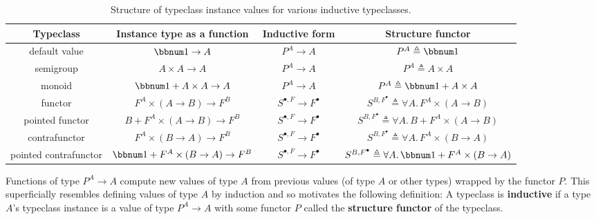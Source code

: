 \begin{table}
\begin{centering}
\begin{tabular}{|c|c|c|c|}
\hline 
\textbf{\small{}Typeclass} & \textbf{\small{}Instance type as a function} & \textbf{\small{}Inductive form} & \textbf{\small{}Structure functor}\tabularnewline
\hline 
\hline 
{\small{}default value} & {\small{}$\bbnum 1\rightarrow A$} & {\small{}$P^{A}\rightarrow A$} & {\small{}$P^{A}\triangleq\bbnum 1$}\tabularnewline
\hline 
{\small{}semigroup} & {\small{}$A\times A\rightarrow A$} & {\small{}$P^{A}\rightarrow A$} & {\small{}$P^{A}\triangleq A\times A$}\tabularnewline
\hline 
{\small{}monoid} & {\small{}$\bbnum 1+A\times A\rightarrow A$} & {\small{}$P^{A}\rightarrow A$} & {\small{}$P^{A}\triangleq\bbnum 1+A\times A$}\tabularnewline
\hline 
{\small{}functor} & {\small{}$F^{A}\times\left(A\rightarrow B\right)\rightarrow F^{B}$} & {\small{}$S^{\bullet,F}\rightarrow F^{\bullet}$} & {\small{}$S^{B,F^{\bullet}}\triangleq\forall A.\,F^{A}\times\left(A\rightarrow B\right)$}\tabularnewline
\hline 
{\small{}pointed functor} & {\small{}$B+F^{A}\times\left(A\rightarrow B\right)\rightarrow F^{B}$} & {\small{}$S^{\bullet,F}\rightarrow F^{\bullet}$} & {\small{}$S^{B,F^{\bullet}}\triangleq\forall A.\,B+F^{A}\times\left(A\rightarrow B\right)$}\tabularnewline
\hline 
{\small{}contrafunctor} & {\small{}$F^{A}\times(B\rightarrow A)\rightarrow F^{B}$} & {\small{}$S^{\bullet,F}\rightarrow F^{\bullet}$} & {\small{}$S^{B,F^{\bullet}}\triangleq\forall A.\,F^{A}\times\left(B\rightarrow A\right)$}\tabularnewline
\hline 
{\small{}pointed contrafunctor} & {\small{}$\bbnum 1+F^{A}\times\left(B\rightarrow A\right)\rightarrow F^{B}$} & {\small{}$S^{\bullet,F}\rightarrow F^{\bullet}$} & {\small{}$S^{B,F^{\bullet}}\triangleq\forall A.\,\bbnum 1+F^{A}\times\left(B\rightarrow A\right)$}\tabularnewline
\hline 
\end{tabular}
\par\end{centering}
\caption{Structure of typeclass instance values for various inductive typeclasses.\label{tab:Types-of-typeclass-instance-values}}

\end{table}

Functions of type $P^{A}\rightarrow A$ compute new values of type
$A$ from previous values (of type $A$ or other types) wrapped by
the functor $P$. This superficially resembles defining values of
type $A$ by induction and so motivates the following definition:
A typeclass is \textbf{inductive}
if a type $A$\textsf{'}s typeclass instance is a value of type $P^{A}\rightarrow A$
with some functor $P$ called the \textbf{structure
functor} of the typeclass. 

